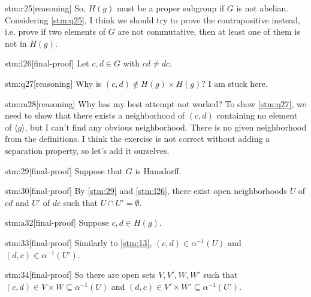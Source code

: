 \begin{stm}{stm:r25}[reasoning]
So, $H(g)$ must be a proper subgroup if $G$ is not abelian. Considering \ref{stm:q25}, I think we should try to prove the contrapositive instead, i.e. prove if two elements of $G$ are not commutative, then at least one of them is not in $H(g)$.
\end{stm}

\begin{stm}{stm:l26}[final-proof]
  Let $c, d \in G$ with $cd \ne dc$.
\end{stm}

\begin{stm}{stm:q27}[reasoning]
Why is $(c,d) \notin H(g) \times H(g)$? I am stuck here.
\end{stm}

\begin{stm}{stm:m28}[reasoning]
Why has my best attempt not worked? To show \ref{stm:q27}, we need to show that there exists a neighborhood of $(c,d)$ containing no element of ${\langle g \rangle}$, but I can't find any obvious neighborhood. There is no given neighborhood from the definitions. I think the exercise is not correct without adding a separation property, so let's add it ourselves.
\end{stm}

\begin{stm}{stm:29}[final-proof]
Suppose that $G$ is Hausdorff. 
\end{stm}

\begin{stm}{stm:30}[final-proof]
By \ref{stm:29} and \ref{stm:l26}, there exist open neighborhoods $U$ of $cd$ and $U'$ of $dc$ such that $U \cap U' = \emptyset$.
\end{stm}

\begin{stm}{stm:a32}[final-proof]
Suppose $c,d \in H(g)$.
\end{stm}

\begin{stm}{stm:33}[final-proof]
Similarly to \ref{stm:13}, $(c,d) \in \alpha^{-1}(U)$ and $(d,c) \in \alpha^{-1}(U')$.
\end{stm}

\begin{stm}{stm:34}[final-proof]
So there are open sets $V,V',W,W'$ such that $(c,d) \in V \times W \subseteq \alpha^{-1}(U)$ and $(d,c) \in V' \times W' \subseteq \alpha^{-1}(U')$.
\end{stm}

